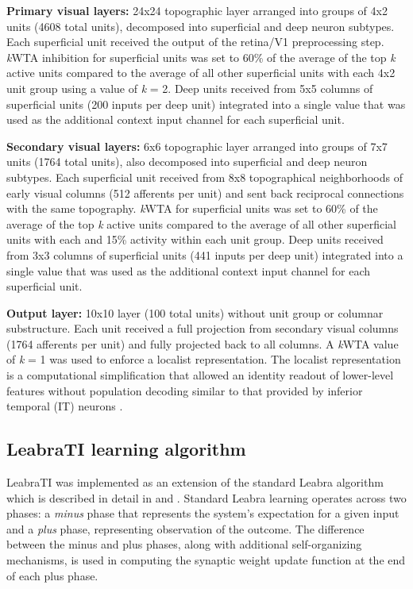 \documentclass[dwyatte_dissertation.tex]{subfiles}
\begin{document}
\textbf{Primary visual layers:} 24x24 topographic layer arranged into groups of 4x2 units (4608 total units), decomposed into superficial and deep neuron subtypes. Each superficial unit received the output of the retina/V1 preprocessing step. \textit{k}WTA inhibition for superficial units was set to 60\% of the average of the top \textit{k} active units compared to the average of all other superficial units with each 4x2 unit group using a value of \textit{k} = 2. Deep units received from 5x5 columns of superficial units (200 inputs per deep unit) integrated into a single value that was used as the additional context input channel for each superficial unit.

\textbf{Secondary visual layers:} 6x6 topographic layer arranged into groups of 7x7 units (1764 total units), also decomposed into superficial and deep neuron subtypes. Each superficial unit received from 8x8 topographical neighborhoods of early visual columns (512 afferents per unit) and sent back reciprocal connections with the same topography. \textit{k}WTA for superficial units was set to 60\% of the average of the top \textit{k} active units compared to the average of all other superficial units with each and 15\% activity within each unit group. Deep units received from 3x3 columns of superficial units (441 inputs per deep unit) integrated into a single value that was used as the additional context input channel for each superficial unit.

\textbf{Output layer:} 10x10 layer (100 total units) without unit group or columnar substructure. Each unit received a full projection from secondary visual columns (1764 afferents per unit) and fully projected back to all columns. A \textit{k}WTA value of \textit{k} = 1 was used to enforce a localist representation. The localist representation is a computational simplification that allowed an identity readout of lower-level features without population decoding similar to that provided by inferior temporal (IT) neurons  \cite{HungKreimanPoggioEtAl05,LiCoxZoccolanEtAl09}. 

\subsection{LeabraTI learning algorithm}

LeabraTI was implemented as an extension of the standard Leabra algorithm which is described in detail in  and . Standard Leabra learning operates across two phases: a \textit{minus} phase that represents the system's expectation for a given input and a \textit{plus} phase, representing observation of the outcome. The difference between the minus and plus phases, along with additional self-organizing mechanisms, is used in computing the synaptic weight update function at the end of each plus phase. 
\end{document}
